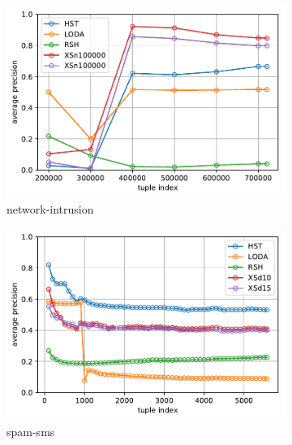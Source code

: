 \documentclass[11pt,onecolumn]{article}
\begin{document}
\begin{figure}[ht!]
    \centering
    \begin{subfigure}[t]{0.24\textwidth}
        \centering
        \includegraphics[width=\linewidth]{fig/HttpSmtpContinuous_ap_over_time.pdf}
        \caption{network-intrusion}
    \end{subfigure}
    \hfill
    \begin{subfigure}[t]{0.24\textwidth}
        \centering
        \includegraphics[width=\linewidth]{fig/SpamSMS_ap_over_time.pdf}
        \caption{spam-sms}
    \end{subfigure}
		\hfill
    \begin{subfigure}[t]{0.24\textwidth}
        \centering

\end{subfigure}
\end{figure}
\end{document}
